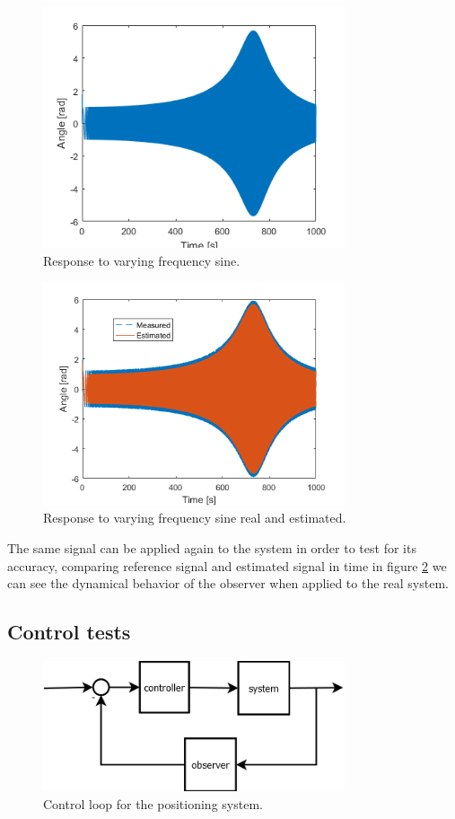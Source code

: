 \documentclass[journal]{IEEEtran}
\begin{document}
\begin{figure}[!t]
\centering
\includegraphics[width=3.5in]{chirp_response.png}
\caption{Response to varying frequency sine.}
\label{fig:chirp_response}
\end{figure}


\begin{figure}[!t]
\centering
\includegraphics[width=3.5in]{chirp_response_real.png}
\caption{Response to varying frequency sine real and estimated.}
\label{fig:chirp_response_estimated}
\end{figure}



The same signal can be applied again to the system in order to test for its accuracy, comparing reference signal and estimated signal in time in figure \ref{fig:chirp_response_estimated} we can see the dynamical behavior of the observer when applied to the real system.

\subsection{Control tests}

\begin{figure}[!t]
\centering
\includegraphics[width=3.5in]{control_loop.png}
\caption{Control loop for the positioning system.}
\label{fig:control_loop}
\end{figure}
\end{document}
